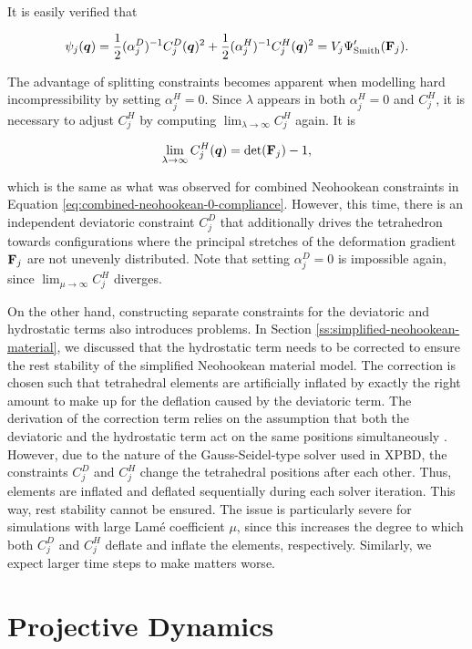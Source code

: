 \noindent It is easily verified that

\[
    \psi_j(\bm{q}) = \frac{1}{2}(\alpha^{D}_j)^{-1} C^D_j(\bm{q})^2 + \frac{1}{2}(\alpha^{H}_j)^{-1} C^H_j(\bm{q})^2 
    = V_j\Psi^\prime_{\text{Smith}}(\mathbf{F}_j).
\]

The advantage of splitting constraints becomes apparent when modelling hard incompressibility by setting $\alpha^H_j = 0$. Since $\lambda$ 
appears in both $\alpha^H_j = 0$ and $C^H_j$, it is necessary to adjust $C^H_j$ by computing $\lim_{\lambda\to\infty}C^H_j$ again. It is 

\[
    \lim_{\lambda\to\infty}C^H_j(\bm{q}) = \text{det}(\mathbf{F}_j) - 1,
\]

\noindent which is the same as what was observed for combined Neohookean constraints in Equation \ref{eq:combined-neohookean-0-compliance}.
However, this time, there is an independent deviatoric constraint $C^D_j$ that additionally drives the tetrahedron towards configurations 
where the principal stretches of the deformation gradient $\mathbf{F}_j$ are not unevenly distributed. Note that setting $\alpha^D_j = 0$ is 
impossible again, since $\lim_{\mu\to\infty}C^H_j$ diverges.

On the other hand, constructing separate constraints for the deviatoric and hydrostatic terms also introduces problems. In 
Section \ref{ss:simplified-neohookean-material}, we discussed that the hydrostatic term needs to be corrected to ensure the rest stability of the simplified 
Neohookean material model. The 
correction is chosen such that tetrahedral elements are artificially inflated by exactly the right amount to make up for the deflation caused 
by the deviatoric term. The derivation of the correction term relies on the assumption that both the deviatoric and the hydrostatic term act 
on the same positions simultaneously \cite{smith2018}. However, due to the nature of the Gauss-Seidel-type solver used in XPBD, the constraints 
$C^D_j$ and $C^H_j$ change the tetrahedral positions after each other. Thus, elements are inflated and deflated sequentially during each solver 
iteration. This way, rest stability cannot be ensured. The issue is particularly severe for simulations with large Lamé coefficient $\mu$, 
since this increases the degree to which both $C^D_j$ and $C^H_j$ deflate and inflate the elements, respectively. Similarly, we expect 
larger time steps to make matters worse.

\section{Projective Dynamics}\label{s:pd}

